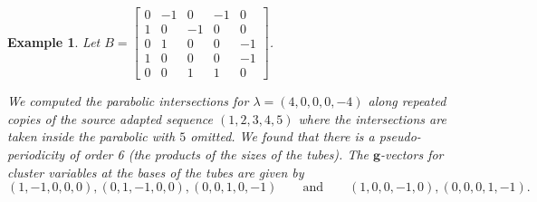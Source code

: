 \documentclass{amsart}
\newtheorem{example}[theorem]{Example}
\numberwithin{theorem}{section}
\newcommand{\bfg}{\boldsymbol{g}}
\begin{document}
\begin{example}
  Let $B=\left[\begin{array}{ccccc} 0 & -1 & 0 & -1 & 0\\ 1 & 0 & -1 & 0 & 0\\ 0 & 1 & 0 & 0 & -1\\ 1 & 0 & 0 & 0 & -1\\ 0 & 0 & 1 & 1 & 0 \end{array}\right]$.

  We computed the parabolic intersections for $\lambda=(4,0,0,0,-4)$ along repeated copies of the source adapted sequence $(1,2,3,4,5)$ where the intersections are taken inside the parabolic with $5$ omitted.
  We found that there is a pseudo-periodicity of order 6 (the products of the sizes of the tubes).
  The $\bfg$-vectors for cluster variables at the bases of the tubes are given by
  \[(1, -1, 0, 0, 0), (0, 1, -1, 0, 0), (0, 0, 1, 0, -1) \qquad \text{and} \qquad (1, 0, 0, -1, 0), (0, 0, 0, 1, -1).\]


\end{example}
\end{document}

